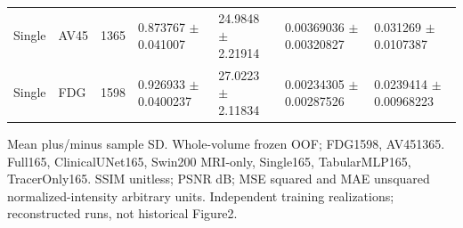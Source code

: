 \documentclass{article}
\providecommand{\DIFaddtex}[1]{{\protect\color{blue} \sf #1}} %
\providecommand{\DIFadd}[1]{\texorpdfstring{\DIFaddtex{#1}}{#1}} %
\begin{document}
\begin{landscape}
\begin{longtable}{lllllll}
Single & AV45 & 1365 & 0.873767 \(\pm\) 0.041007 & 24.9848 \(\pm\) 2.21914 & 0.00369036 \(\pm\) 0.00320827 & 0.031269 \(\pm\) 0.0107387 \\
Single & FDG & 1598 & 0.926933 \(\pm\) 0.0400237 & 27.0223 \(\pm\) 2.11834 & 0.00234305 \(\pm\) 0.00287526 & 0.0239414 \(\pm\) 0.00968223 \\
\end{longtable}
\noindent\parbox{\linewidth}{\footnotesize \DIFadd{Mean plus/minus sample SD. Whole-volume frozen OOF; FDG1598, AV451365. Full165, ClinicalUNet165, Swin200 MRI-only, Single165, TabularMLP165, TracerOnly165. SSIM unitless; PSNR dB; MSE squared and MAE unsquared normalized-intensity arbitrary units. Independent training realizations; reconstructed runs, not historical Figure2.}}
\endgroup
\end{landscape}

\end{document}

